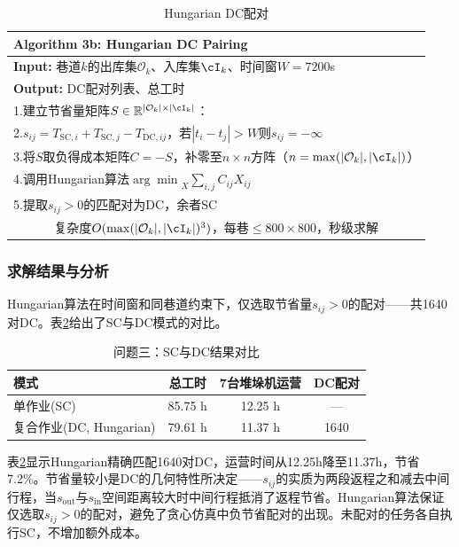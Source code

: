 \documentclass[a4paper]{cumcmthesis}
\newcommand{\headcol}{\rowcolor{tableheadcolor}}
\newcommand{\cO}{\mathcal{O}}
\begin{document}
\begin{table}[htbp]
\centering\footnotesize
\caption{Hungarian DC配对}
\label{tab:algo3b}
\begin{tabular}{p{}}
\toprule
\headcol \textbf{Algorithm 3b: Hungarian DC Pairing}\\
\midrule
\textbf{Input:} 巷道$k$的出库集$\cO_k$、入库集$\cI_k$、时间窗$W=7200$s\\
\textbf{Output:} DC配对列表、总工时\\
\midrule
1.\quad 建立节省量矩阵$S\in\mathbb{R}^{|\cO_k|\times|\cI_k|}$：\\
2.\quad\qquad $s_{ij}=T_{\text{SC},i}+T_{\text{SC},j}-T_{\text{DC},ij}$，若$|t_i-t_j|>W$则$s_{ij}=-\infty$\\
3.\quad 将$S$取负得成本矩阵$C=-S$，补零至$n\times n$方阵（$n=\max(|\cO_k|,|\cI_k|)$）\\
4.\quad 调用Hungarian算法${\arg\min}_{X}\sum_{i,j}C_{ij}X_{ij}$\\
5.\quad 提取$s_{ij}>0$的匹配对为DC，余者SC\\
\midrule
\multicolumn{1}{c}{复杂度$O(\max(|\cO_k|,|\cI_k|)^3)$，每巷$\leq 800\times 800$，秒级求解}\\
\bottomrule
\end{tabular}
\end{table}

\FloatBarrier\subsubsection{求解结果与分析}

Hungarian算法在时间窗和同巷道约束下，仅选取节省量$s_{ij}>0$的配对——共1640对DC。表\ref{tab:p3_result}给出了SC与DC模式的对比。

\begin{table}[htbp]
\centering\small
\caption{问题三：SC与DC结果对比}
\label{tab:p3_result}
\begin{tabular}{lccc}
\toprule
\headcol 模式 & 总工时 & 7台堆垛机运营 & DC配对 \\
\midrule
单作业(SC) & 85.75 h & 12.25 h & --- \\
复合作业(DC, Hungarian) & 79.61 h & 11.37 h & 1640 \\
\bottomrule
\end{tabular}
\end{table}

表\ref{tab:p3_result}显示Hungarian精确匹配1640对DC，运营时间从12.25h降至11.37h，节省7.2\%。节省量较小是DC的几何特性所决定——$s_{ij}$的实质为两段返程之和减去中间行程，当$s_{\text{out}}$与$s_{\text{in}}$空间距离较大时中间行程抵消了返程节省。Hungarian算法保证仅选取$s_{ij}>0$的配对，避免了贪心仿真中负节省配对的出现。未配对的任务各自执行SC，不增加额外成本。
\end{document}
